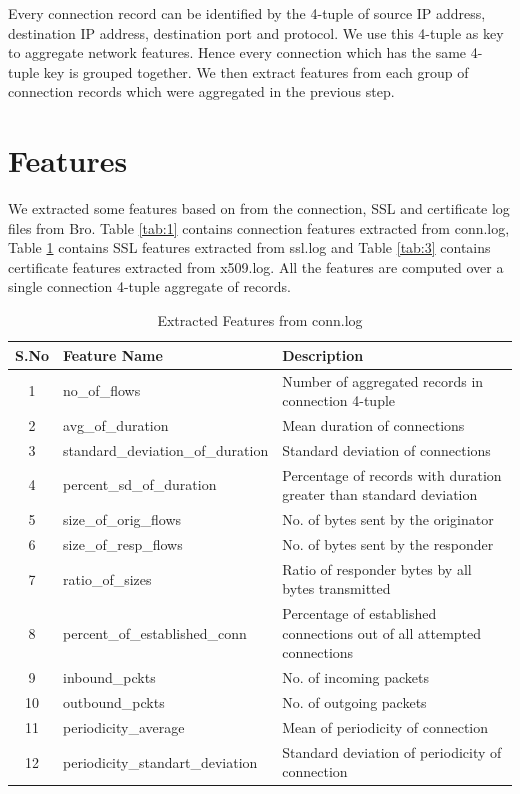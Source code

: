 Every connection record can be identified by the 4-tuple of source IP address, destination IP address, destination port and protocol. We use this 4-tuple as key to aggregate network features. Hence every connection which has the same 4-tuple key is grouped together. We then extract features from each group of connection records which were aggregated in the previous step.

\section{Features}

We extracted some features based on \cite{Frantisek2017, AndersonM16} from the connection, SSL and certificate log files from Bro. Table \ref{tab:1} contains connection features extracted from conn.log, Table \ref{tab:2} contains SSL features extracted from ssl.log and Table \ref{tab:3} contains certificate features extracted from x509.log. All the features are computed over a single connection 4-tuple aggregate of records.

\begin{table}[!htb]
	\caption{Extracted Features from conn.log\label{tab:2}}
	\begin{center}
		\begin{tabular}{c|p{}|p{}}\hline\hline
			S.No & Feature Name & \multicolumn{1}{l}{Description} \\ \hline
			1 & no\_of\_flows & Number of aggregated records in connection 4-tuple\\
			2 & avg\_of\_duration & Mean duration of connections \\
			3 & standard\_deviation\_of\_duration & Standard deviation of connections\\
			4 & percent\_sd\_of\_duration & Percentage of records with duration greater than standard deviation\\
			5 & size\_of\_orig\_flows & No. of bytes sent by the originator\\
			6 & size\_of\_resp\_flows & No. of bytes sent by the responder\\
			7 & ratio\_of\_sizes & Ratio of responder bytes by all bytes transmitted \\
			8 & percent\_of\_established\_conn & Percentage of established connections out of all attempted connections\\
			9 & inbound\_pckts & No. of incoming packets\\
			10 & outbound\_pckts & No. of outgoing packets\\
			11 & periodicity\_average & Mean of periodicity of connection\\
			12 & periodicity\_standart\_deviation & Standard deviation of periodicity of connection\\
			\hline\hline
		\end{tabular}
	\end{center}
\end{table}

